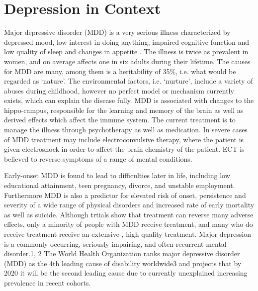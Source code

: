 \section{Depression in Context}
Major depressive disorder (MDD) is a very serious illness characterized by depressed mood, low interest in doing anything, impaired cognitive function and low quality of sleep and changes in appetite \cite{major-depressive-disorder}. The illness is twice as prevalent in women, and on average affects one in six adults during their lifetime. The causes for MDD are many, among them is a heritability of 35\%, i.e. what would be regarded as ‘nature’. The environmental factors, i.e. ‘nurture’, include a variety of abuses during childhood, however no perfect model or mechanism currently exists, which can explain the disease fully. MDD is associated with changes to the hippo-campus, responsible for the learning and memory of the brain as well as derived effects which affect the immune system. The current treatment is to manage the illness through psychotherapy as well as medication. In severe cases of MDD treatment may include electroconvulsive therapy, where the patient is given electroshock in order to affect the brain chemistry of the patient. ECT is believed to reverse symptoms of a range of mental conditions.

Early-onset MDD is found to lead to difficulties later in life, including low educational attainment, teen pregnancy, divorce, and unstable employment. Furthermore MDD is also a predictor for elevated risk of onset, persistence and severity of a wide range of physical disorders and increased rate of early mortality as well as suicide. Although trtials show that treatment can reverse many adverse effects, only a minority of people with MDD receive treatment, and many who do receive treatment receive an extensive-,  high quality treatment.
Major depression is a commonly occurring, seriously impairing, and often recurrent mental disorder.1, 2 The World Health Organization ranks major depressive disorder (MDD) as the 4th leading cause of disability worldwide3 and projects that by 2020 it will be the second leading cause due to currently unexplained increasing prevalence in recent cohorts.

